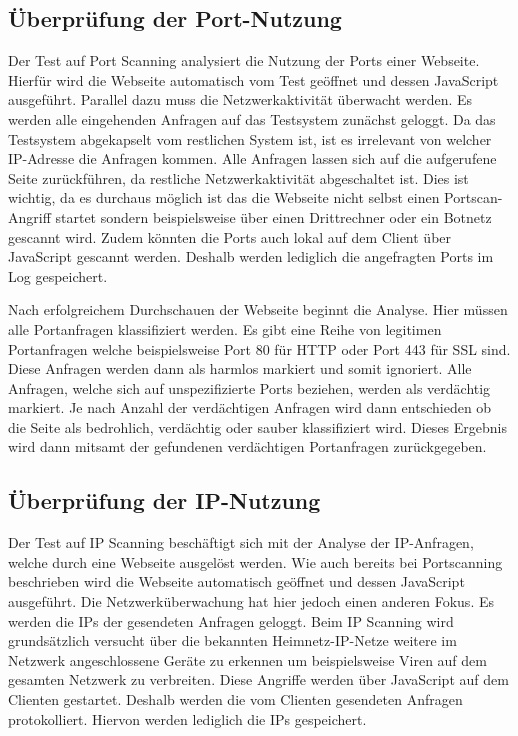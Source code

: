 \subsection{Überprüfung der Port-Nutzung}
Der Test auf Port Scanning analysiert die Nutzung der Ports einer Webseite. Hierfür wird die Webseite automatisch vom Test geöffnet und dessen JavaScript ausgeführt. Parallel dazu muss die Netzwerkaktivität überwacht werden. Es werden alle eingehenden Anfragen auf das Testsystem zunächst geloggt. Da das Testsystem abgekapselt vom restlichen System ist, ist es irrelevant von welcher IP-Adresse die Anfragen kommen. Alle Anfragen lassen sich auf die aufgerufene Seite zurückführen, da restliche Netzwerkaktivität abgeschaltet ist. Dies ist wichtig, da es durchaus möglich ist das die Webseite nicht selbst einen Portscan-Angriff startet sondern beispielsweise über einen Drittrechner oder ein Botnetz gescannt wird. Zudem könnten die Ports auch lokal auf dem Client über JavaScript gescannt werden. Deshalb werden lediglich die angefragten Ports im Log gespeichert.

Nach erfolgreichem Durchschauen der Webseite beginnt die Analyse. Hier müssen alle Portanfragen klassifiziert werden. Es gibt eine Reihe von legitimen Portanfragen welche beispielsweise Port 80 für HTTP oder Port 443 für SSL sind. Diese Anfragen werden dann als harmlos markiert und somit ignoriert. Alle Anfragen, welche sich auf unspezifizierte Ports beziehen, werden als verdächtig markiert. Je nach Anzahl der verdächtigen Anfragen wird dann entschieden ob die Seite als bedrohlich, verdächtig oder sauber klassifiziert wird. Dieses Ergebnis wird dann mitsamt der gefundenen verdächtigen Portanfragen zurückgegeben.

\subsection{Überprüfung der IP-Nutzung}
Der Test auf IP Scanning beschäftigt sich mit der Analyse der IP-Anfragen, welche durch eine Webseite ausgelöst werden. Wie auch bereits bei Portscanning beschrieben wird die Webseite automatisch geöffnet und dessen JavaScript ausgeführt. Die Netzwerküberwachung hat hier jedoch einen anderen Fokus. Es werden die IPs der gesendeten Anfragen geloggt. Beim IP Scanning wird grundsätzlich versucht über die bekannten Heimnetz-IP-Netze weitere im Netzwerk angeschlossene Geräte zu erkennen um beispielsweise Viren auf dem gesamten Netzwerk zu verbreiten. Diese Angriffe werden über JavaScript auf dem Clienten gestartet. Deshalb werden die vom Clienten gesendeten Anfragen protokolliert. Hiervon werden lediglich die IPs gespeichert.

